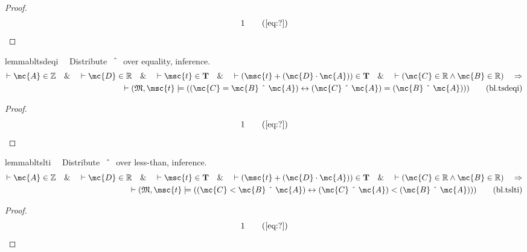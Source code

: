 \begin{proof}
\begin{align}
  1 &&  & &(\mbox{\ref{eq:?}})\notag
\end{align}
\end{proof}

\begin{restatable}{lemma}{bltsdeqi}~~ Distribute $~\string^~$ over equality,
inference.
\begin{align}
\vdash \mc{A} \in \mathbb{Z}\quad\&\quad \vdash \mc{D} \in
    \mathbb{R}\quad\&\quad \vdash \msc{t} \in \mathbf{T}\quad\&\quad \vdash (
    \msc{t} + ( \mc{D} \cdot \mc{A} ) ) \in \mathbf{T}\quad\&\quad \vdash (
    \mc{C} \in \mathbb{R} \wedge \mc{B} \in \mathbb{R} )\quad\Rightarrow \notag \\ 
	\quad
    \vdash ( \mathfrak{M} , \msc{t} \models ( ( \mc{C} = \mc{B} ~\string^~
    \mc{A} ) \leftrightarrow ( \mc{C} ~\string^~ \mc{A} ) = ( \mc{B} ~\string^~
    \mc{A} ) ) )\label{eq:bl.tsdeqi}\tag{bl.tsdeqi}
\end{align}
\end{restatable}

\begin{proof}
\begin{align}
  1 &&  & &(\mbox{\ref{eq:?}})\notag
\end{align}
\end{proof}

\begin{restatable}{lemma}{bltslti}~~ Distribute $~\string^~$ over less-than,
inference.
\begin{align}
\vdash \mc{A} \in \mathbb{Z}\quad\&\quad \vdash \mc{D} \in
    \mathbb{R}\quad\&\quad \vdash \msc{t} \in \mathbf{T}\quad\&\quad \vdash (
    \msc{t} + ( \mc{D} \cdot \mc{A} ) ) \in \mathbf{T}\quad\&\quad \vdash (
    \mc{C} \in \mathbb{R} \wedge \mc{B} \in \mathbb{R} )\quad\Rightarrow \notag \\ 
	\quad
    \vdash ( \mathfrak{M} , \msc{t} \models ( ( \mc{C} < \mc{B} ~\string^~
    \mc{A} ) \leftrightarrow ( \mc{C} ~\string^~ \mc{A} ) < ( \mc{B} ~\string^~
    \mc{A} ) ) )\label{eq:bl.tslti}\tag{bl.tslti}
\end{align}
\end{restatable}

\begin{proof}
\begin{align}
  1 &&  & &(\mbox{\ref{eq:?}})\notag
\end{align}
\end{proof}

